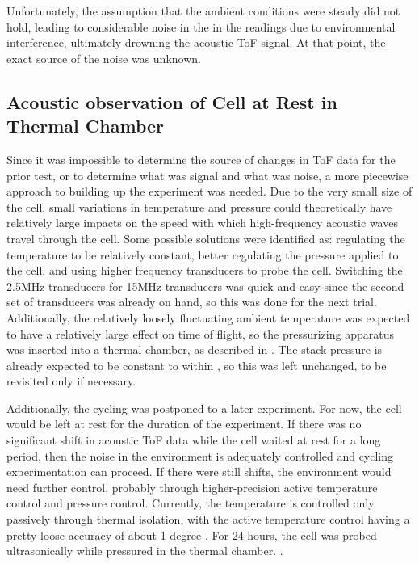 Unfortunately, the assumption that the ambient conditions were steady did not hold, leading to considerable noise in the in the readings due to environmental interference, ultimately drowning the acoustic ToF signal. At that point, the exact source of the noise was unknown.

    
\subsection{Acoustic observation of Cell at Rest in Thermal Chamber}

Since it was impossible to determine the source of changes in ToF data for the prior test, or to determine what was signal and what was noise, a more piecewise approach to building up the experiment was needed. Due to the very small size of the cell, small variations in temperature and pressure could theoretically have relatively large impacts on the speed with which high-frequency acoustic waves travel through the cell. Some possible solutions were identified as: regulating the temperature to be relatively constant, better regulating the pressure applied to the cell, and using higher frequency transducers to probe the cell. Switching the 2.5MHz transducers for 15MHz transducers was quick and easy since the second set of transducers was already on hand, so this was done for the next trial. Additionally, the relatively loosely fluctuating ambient temperature was expected to have a relatively large effect on time of flight, so the pressurizing apparatus was inserted into a thermal chamber, as described in . The stack pressure is already expected to be constant to within , so this was left unchanged, to be revisited only if necessary.

Additionally, the cycling was postponed to a later experiment.
For now, the cell would be left at rest for the duration of the experiment. 
If there was no significant shift in acoustic ToF data while the cell waited at rest for a long period, then the noise in the environment is adequately controlled and cycling experimentation can proceed. 
If there were still shifts, the environment would need further control, probably through higher-precision active temperature control and pressure control. 
Currently, the temperature is controlled only passively through thermal isolation, with the active temperature control having a pretty loose accuracy of about 1 degree .
For 24 hours, the cell was probed ultrasonically while pressured in the thermal chamber. .

